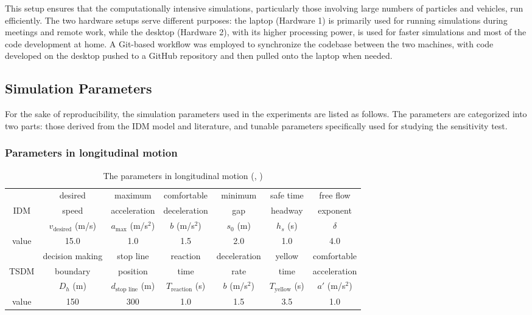 This setup ensures that the computationally intensive simulations, particularly those involving large numbers of particles and vehicles, run efficiently. The two hardware setups serve different purposes: the laptop (Hardware 1) is primarily used for running simulations during meetings and remote work, while the desktop (Hardware 2), with its higher processing power, is used for faster simulations and most of the code development at home. A Git-based workflow was employed to synchronize the codebase between the two machines, with code developed on the desktop pushed to a GitHub repository and then pulled onto the laptop when needed.


\subsection{Simulation Parameters}
For the sake of reproducibility, the simulation parameters used in the experiments are listed as follows. The parameters are categorized into two parts: those derived from the IDM model and literature, and tunable parameters specifically used for studying the sensitivity test.

\subsubsection{Parameters in longitudinal motion}
\begin{table}[htbp]
\small
    \centering
    \begin{tabular}{ccccccc}
    \toprule
         & desired  & maximum   & comfortable   & minimum   & safe time &  free flow  \\
         IDM & speed  &  acceleration  &  deceleration  &  gap  &  headway & exponent \\
         & \(v_{\text{desired}}\) (m/s) & $a_{\text{max}}$ (m/s$^2$)& $b$ (m/s$^2$) & $s_0$ (m) & $h_s$ (s) & \(\delta\)\\
        \hline
         value & 15.0 & 1.0 & 1.5 & 2.0 & 1.0& 4.0 \\
         \toprule
            & decision making & stop line   & reaction   &  deceleration   & yellow   & comfortable   \\
        TSDM &  boundary & position  &  time  &   rate  &  time  &  acceleration  \\
         & $D_h$ (m) & $d_\text{stop line}$ (m)& $T_{\text{reaction}}$ (s)& $b$ (m/s$^2$) & $T_{\text{yellow}}$ (s) & $a'$ (m/s$^2$) \\
        \hline
         value & 150 & 300 & 1.0 & 1.5 & 3.5 & 1.0 \\
         \toprule
    \end{tabular}
    \caption{The parameters in longitudinal motion (\textcite{treiber2013traffic}, \textcite{gates2007analysis})}
    \label{parameters in longitudinal motion}
\end{table}

